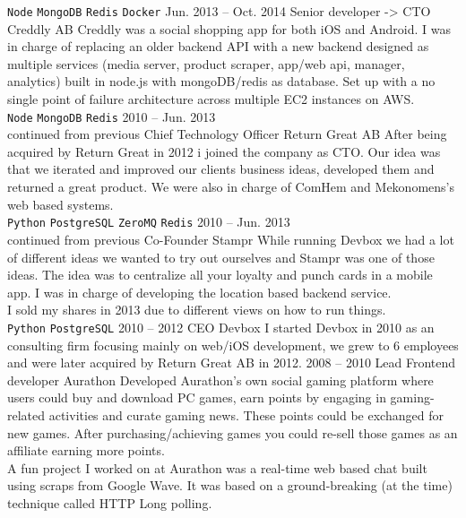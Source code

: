 \documentclass[9pt]{template} %
\begin{document}
\begin{entrylist}
{      \texttt{Node}\slashsep
      \texttt{MongoDB}\slashsep
      \texttt{Redis}\slashsep
      \texttt{Docker}
    }
  \entry
    {Jun. 2013 -- Oct. 2014}
    {Senior developer -> CTO}
    {Creddly AB}
    {Creddly was a social shopping app for both iOS and Android. I was in charge of replacing an older backend API with a new backend designed as multiple services (media server, product scraper, app/web api, manager, analytics) built in node.js with mongoDB/redis as database. Set up with a no single point of failure architecture across multiple EC2 instances on AWS.\\
      \texttt{Node}\slashsep
      \texttt{MongoDB}\slashsep
      \texttt{Redis}
    }
  \entry
    {2010 -- Jun. 2013\\\footnotesize{continued from previous}}
    {Chief Technology Officer}
    {Return Great AB}
    {After being acquired by Return Great in 2012 i joined the company as CTO. Our idea was that we iterated and improved our clients business ideas, developed them and returned a great product. We were also in charge of ComHem and Mekonomens’s web based systems.\\
      \texttt{Python}\slashsep
      \texttt{PostgreSQL}\slashsep
      \texttt{ZeroMQ}\slashsep
      \texttt{Redis}
    }
  \entry
    {2010 -- Jun. 2013\\\footnotesize{continued from previous}}
    {Co-Founder}
    {Stampr}
    {While running Devbox we had a lot of different ideas we wanted to try out ourselves and Stampr was one of those ideas. The idea was to centralize all your loyalty and punch cards in a mobile app. I was in charge of developing the location based backend service.\\
      I sold my shares in 2013 due to different views on how to run things.\\
      \texttt{Python}\slashsep
      \texttt{PostgreSQL}
    }
  \entry
    {2010 -- 2012}
    {CEO}
    {Devbox}
    {I started Devbox in 2010 as an consulting firm focusing mainly on web/iOS development, we grew to 6 employees and were later acquired by Return Great AB in 2012.}
  \entry
    {2008 -- 2010}
    {Lead Frontend developer}
    {Aurathon}
    {Developed Aurathon’s own social gaming platform where users could buy and download PC games, earn points by engaging in gaming-related activities and curate gaming news. These points could be exchanged for new games. After purchasing/achieving games you could re-sell those games as an affiliate earning more points.\\
      A fun project I worked on at Aurathon was a real-time web based chat built using scraps from Google Wave. It was based on a ground-breaking (at the time) technique called HTTP Long polling.\\
}
\end{entrylist}
\end{document}
